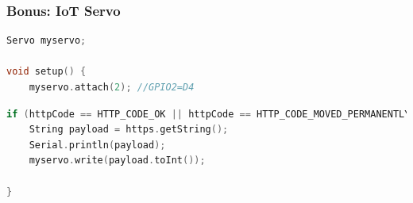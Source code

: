 \documentclass[compress, aspectratio=32]{beamer}
\begin{document}
\begin{frame}[fragile]
    \frametitle{Bonus: IoT Servo}
    \begin{lstlisting}[language=c, firstnumber=25]
Servo myservo;

void setup() {
    myservo.attach(2); //GPIO2=D4
    \end{lstlisting}
    \begin{lstlisting}[language=c, firstnumber=67]
if (httpCode == HTTP_CODE_OK || httpCode == HTTP_CODE_MOVED_PERMANENTLY) {
    String payload = https.getString();
    Serial.println(payload);
    myservo.write(payload.toInt());

}
    \end{lstlisting}
\end{frame}
\end{document}
